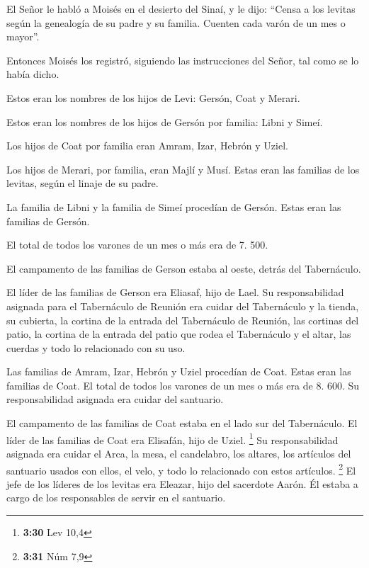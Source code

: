  El Señor le habló a Moisés en el desierto del Sinaí, y
le dijo:  ``Censa a los levitas según la genealogía de su
padre y su familia. Cuenten cada varón de un mes o mayor''.

 Entonces Moisés los registró, siguiendo las
instrucciones del Señor, tal como se lo había dicho.

 Estos eran los nombres de los hijos de Levi: Gersón,
Coat y Merari.

 Estos eran los nombres de los hijos de Gersón por
familia: Libni y Simeí.

 Los hijos de Coat por familia eran Amram, Izar, Hebrón y
Uziel.

 Los hijos de Merari, por familia, eran Majlí y Musí.
Estas eran las familias de los levitas, según el linaje de su padre.

 La familia de Libni y la familia de Simeí procedían de
Gersón. Estas eran las familias de Gersón.

 El total de todos los varones de un mes o más era de 7.
500.

 El campamento de las familias de Gerson estaba al oeste,
detrás del Tabernáculo.

 El líder de las familias de Gerson era Eliasaf, hijo de
Lael.  Su responsabilidad asignada para el Tabernáculo de
Reunión era cuidar del Tabernáculo y la tienda, su cubierta, la cortina
de la entrada del Tabernáculo de Reunión,  las cortinas
del patio, la cortina de la entrada del patio que rodea el Tabernáculo y
el altar, las cuerdas y todo lo relacionado con su uso.

 Las familias de Amram, Izar, Hebrón y Uziel procedían de
Coat. Estas eran las familias de Coat.  El total de todos
los varones de un mes o más era de 8. 600. Su responsabilidad asignada
era cuidar del santuario.

 El campamento de las familias de Coat estaba en el lado
sur del Tabernáculo.  El líder de las familias de Coat
era Elisafán, hijo de Uziel. \footnote{\textbf{3:30} Lev 10,4}
 Su responsabilidad asignada era cuidar el Arca, la mesa,
el candelabro, los altares, los artículos del santuario usados con
ellos, el velo, y todo lo relacionado con estos artículos. \footnote{\textbf{3:31}
  Núm 7,9}  El jefe de los líderes de los levitas era
Eleazar, hijo del sacerdote Aarón. Él estaba a cargo de los responsables
de servir en el santuario.

